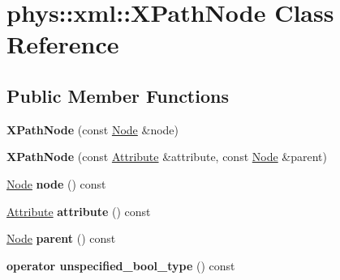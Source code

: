 \hypertarget{classphys_1_1xml_1_1XPathNode}{
\section{phys::xml::XPathNode Class Reference}
\label{df/dd4/classphys_1_1xml_1_1XPathNode}
}
\subsection*{Public Member Functions}
\begin{DoxyCompactItemize}
\item 
\hypertarget{classphys_1_1xml_1_1XPathNode_ab70dcfefef2107eca2d1932faada475e}{
{\bfseries XPathNode} (const \hyperlink{classphys_1_1xml_1_1Node}{Node} \&node)}
\label{df/dd4/classphys_1_1xml_1_1XPathNode_ab70dcfefef2107eca2d1932faada475e}

\item 
\hypertarget{classphys_1_1xml_1_1XPathNode_ad50a16615897cf470492a1974548f804}{
{\bfseries XPathNode} (const \hyperlink{classphys_1_1xml_1_1Attribute}{Attribute} \&attribute, const \hyperlink{classphys_1_1xml_1_1Node}{Node} \&parent)}
\label{df/dd4/classphys_1_1xml_1_1XPathNode_ad50a16615897cf470492a1974548f804}

\item 
\hypertarget{classphys_1_1xml_1_1XPathNode_ae15b153a8362e1c236dbdc87421b92bd}{
\hyperlink{classphys_1_1xml_1_1Node}{Node} {\bfseries node} () const }
\label{df/dd4/classphys_1_1xml_1_1XPathNode_ae15b153a8362e1c236dbdc87421b92bd}

\item 
\hypertarget{classphys_1_1xml_1_1XPathNode_a1aebaedd63760baddcd6fd893e85d613}{
\hyperlink{classphys_1_1xml_1_1Attribute}{Attribute} {\bfseries attribute} () const }
\label{df/dd4/classphys_1_1xml_1_1XPathNode_a1aebaedd63760baddcd6fd893e85d613}

\item 
\hypertarget{classphys_1_1xml_1_1XPathNode_af2f6cb9111e03e772f7fc5e9e452fdc9}{
\hyperlink{classphys_1_1xml_1_1Node}{Node} {\bfseries parent} () const }
\label{df/dd4/classphys_1_1xml_1_1XPathNode_af2f6cb9111e03e772f7fc5e9e452fdc9}

\item 
\hypertarget{classphys_1_1xml_1_1XPathNode_a0d11818941c2e31671c5d0cd8f1ce9f9}{
{\bfseries operator unspecified\_\-bool\_\-type} () const }
\label{df/dd4/classphys_1_1xml_1_1XPathNode_a0d11818941c2e31671c5d0cd8f1ce9f9}


\end{DoxyCompactItemize}
